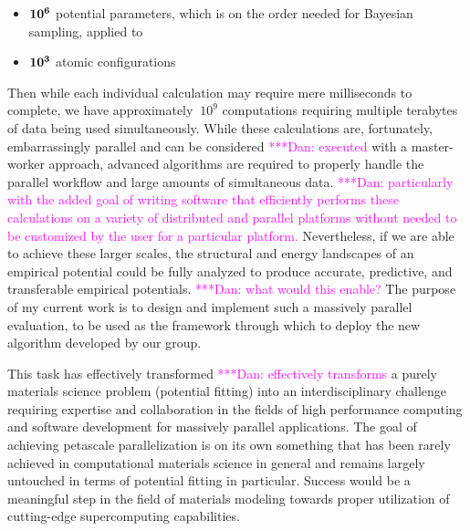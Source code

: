 \documentclass{article}
\newcommand{\katznote}[1]{ {\textcolor{magenta}    { ***Dan:      #1 }}}
\begin{document}
\begin{itemize}
    \item $\bf{10^6}$ potential parameters, which is on the order needed for Bayesian sampling, applied to
    \item $\bf{10^3}$ atomic configurations
\end{itemize}

\noindent Then while each individual calculation may require mere milliseconds to complete, we have approximately $~10^9$ computations requiring multiple terabytes of data being used simultaneously. While these calculations are, fortunately, embarrassingly parallel and can be considered \katznote{executed} with a master-worker approach, advanced algorithms are required to properly handle the parallel workflow and large amounts of simultaneous data. \katznote{particularly with the added goal of writing software that efficiently performs these calculations on a variety of distributed and parallel platforms without needed to be customized by the user for a particular platform.} Nevertheless, if we are able to achieve these larger scales, the structural and energy landscapes of an empirical potential could be fully analyzed to produce accurate, predictive, and transferable empirical potentials. \katznote{what would this enable?} The purpose of my current work is to design and implement such a massively parallel evaluation, to be used as the framework through which to deploy the new algorithm developed by our group.

\bigskip

This task has effectively transformed \katznote{effectively transforms} a purely materials science problem (potential fitting) into an interdisciplinary challenge requiring expertise and collaboration in the fields of high performance computing and software development for massively parallel applications. The goal of achieving petascale parallelization is on its own something that has been rarely achieved in computational materials science in general and remains largely untouched in terms of potential fitting in particular. Success would be a meaningful step in the field of materials modeling towards proper utilization of cutting-edge supercomputing capabilities.
\end{document}
